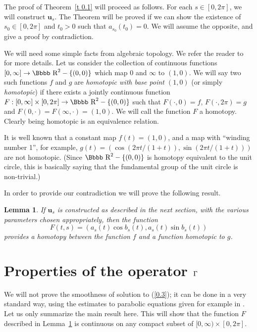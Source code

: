 \documentclass[12pt,twoside]{article}
\newtheorem{lema}{Lemma}[section]
\newcommand {\rdd}{\mbox{\Bbbb R}}
\newcommand {\bu}{{\mathbf{u}}}
\begin{document}
The proof of Theorem~\ref{t 0.1} will proceed as follows.
For each $s \in [0,2\pi]$, we will construct $\bu_s$.  The Theorem
will be proved if we can show the existence of $s_0 \in [0,2\pi]$
and $t_0 > 0$ such that $a_{s_0}(t_0) = 0$.  We will assume the opposite,
and give a proof by contradiction.

We will need some simple facts from algebraic
topology.  We refer the reader to \cite{Mau} for more details.
Let us consider the collection of continuous functions 
$[0,\infty] \to \rdd^2-\{(0,0)\}$ which map $0$ and $\infty$ to $(1,0)$.
We will say two such functions $f$ and $g$ 
are \emph{homotopic with base point $(1,0)$} (or simply \emph{homotopic}) 
if there exists a jointly continuous 
function $F:[0,\infty] \times [0,2\pi] \to \rdd^2-\{(0,0)\}$ such that
$F(\cdot,0) = f$, $F(\cdot,2\pi) = g$ and
$F(0,\cdot) = F(\infty,\cdot) = (1,0)$.  We will call the function $F$
a homotopy.  Clearly being homotopic is an
equivalence relation.  

It is well known that a constant map
$f(t) = (1,0)$, and a map with ``winding number 1'', for example,
$g(t) = (\cos(2\pi t/(1+t)),\sin(2\pi t/(1+t)))$ are not homotopic.
(Since $\rdd^2-\{(0,0)\}$ is homotopy equivalent to the unit circle,
this is basically saying that the fundamental group of the unit circle
is non-trivial.)

In order to provide our contradiction we will prove the following result.

\begin{lema}
\label{homotopy}  If $\bu_s$ is constructed as described in the
next section, with the various parameters chosen appropriately, 
then the function
$$ F(t,s) = (a_s(t) \cos b_s(t), a_s(t) \sin b_s(t)) $$
provides a homotopy between the function $f$
and a function homotopic to $g$.
\end{lema}












\section{Properties of the operator $\Gamma$}
\setcounter{equation}{0}

We will not prove the smoothness of solution to (\ref{0.3});
it can be done in a very standard way, using the estimates to parabolic
equations given for example in \cite{LaSoUr}. 
Let us only summarize the main result
here.  This will show that the function $F$ described in 
Lemma~\ref{homotopy} is continuous on any compact subset of
$[0,\infty)\times[0,2\pi]$.
\end{document}
